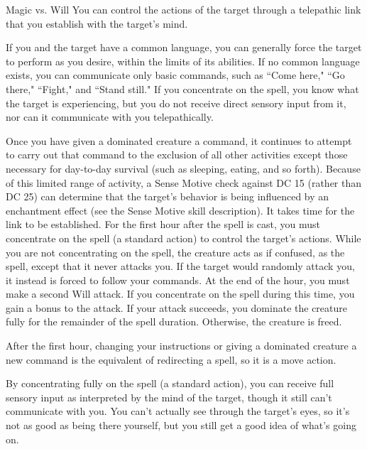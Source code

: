 \begin{spellheader}
    \spellrng{\rngmed}
\end{spellheader}
\begin{spelleffects}
    \begin{spellattack}{Magic vs. Will}
        \spellsuccess You can control the actions of the target through a telepathic link that you establish with the target's mind.
        \par If you and the target have a common language, you can generally force the target to perform as you desire, within the limits of its abilities. If no common language exists, you can communicate only basic commands, such as ``Come here," ``Go there," ``Fight," and ``Stand still." If you concentrate on the spell, you know what the target is experiencing, but you do not receive direct sensory input from it, nor can it communicate with you telepathically.
        \par Once you have given a dominated creature a command, it continues to attempt to carry out that command to the exclusion of all other activities except those necessary for day-to-day survival (such as sleeping, eating, and so forth). Because of this limited range of activity, a Sense Motive check against DC 15 (rather than DC 25) can determine that the target's behavior is being influenced by an enchantment effect (see the Sense Motive skill description).
        It takes time for the link to be established. For the first hour after the spell is cast, you must concentrate on the spell (a standard action) to control the target's actions. While you are not concentrating on the spell, the creature acts as if confused, as the  spell, except that it never attacks you. If the target would randomly attack you, it instead is forced to follow your commands. At the end of the hour, you must make a second Will attack. If you concentrate on the spell during this time, you gain a  bonus to the attack. If your attack succeeds, you dominate the creature fully for the remainder of the spell duration. Otherwise, the creature is freed.
        \par After the first hour, changing your instructions or giving a dominated creature a new command is the equivalent of redirecting a spell, so it is a move action.
        \par By concentrating fully on the spell (a standard action), you can receive full sensory input as interpreted by the mind of the target, though it still can't communicate with you. You can't actually see through the target's eyes, so it's not as good as being there yourself, but you still get a good idea of what's going on.

\end{spellattack}
\end{spelleffects}
